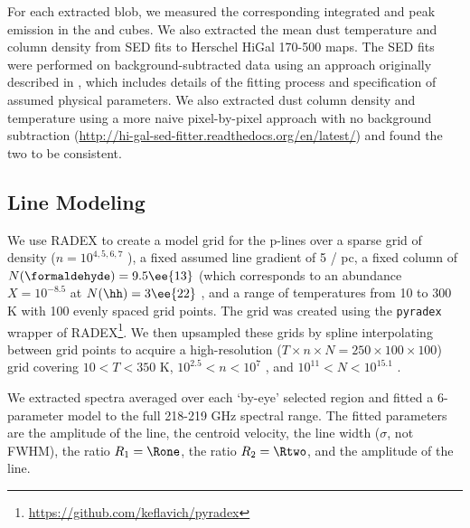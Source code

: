 For each extracted blob, we measured the corresponding integrated and peak
emission in the \threetwoone and \thirteenco cubes.  We also extracted the mean
dust temperature and column density from SED fits to Herschel HiGal 170-500\um
maps.  The SED fits were performed on background-subtracted data using an
approach originally described in \citet{Battersby2011a}, which includes details
of the fitting process and specification of assumed physical parameters.  We
also extracted dust column density and temperature using a more naive
pixel-by-pixel approach with no background subtraction
(\url{http://hi-gal-sed-fitter.readthedocs.org/en/latest/}) and found the two
to be consistent.

\subsection{Line Modeling}
\label{sec:linemodeling}
We use RADEX \citet{van-Der-Tak2007a} to create a model grid for the
p-\formaldehyde lines over a sparse grid of density ($n=10^{4,5,6,7}$ \percc),
a fixed assumed line gradient of 5 \kms / pc, a fixed column of \formaldehyde
$N(\formaldehyde) = 9.5\ee{13}$ \persc (which corresponds to an abundance
$X=10^{-8.5}$ at $N(\hh) = 3\ee{22}$ \persc, and a range of temperatures from
10 to 300 K with 100 evenly spaced grid points.  The grid was created using
the \texttt{pyradex} wrapper of
RADEX\footnote{\url{https://github.com/keflavich/pyradex}}.
We then upsampled these grids by spline interpolating between grid points to
acquire a high-resolution ($T\times n \times N = 250\times100\times100$) grid
covering $10<T<350$ K, $10^{2.5} < n < 10^7$ \percc, and $10^{11} < N <
10^{15.1}$ \persc\perkmspc.

We extracted spectra averaged over each `by-eye' selected region and fitted
a 6-parameter model to the full 218-219 GHz spectral range.  The fitted
parameters are the amplitude of the \formaldehyde \threeohthree line, the
centroid velocity, the line width ($\sigma$, not FWHM), the ratio $R_1 =
\Rone$, the ratio $R_2 = \Rtwo$, and the amplitude of the \methanol \fourtwotwo
line.


